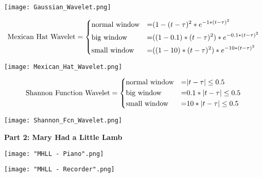\documentclass{cup-pan}
\begin{document}
\begin{center}
\texttt{[image: Gaussian\_Wavelet.png]}
\end{center}

\vskip 1.0in

$$\text{Mexican Hat Wavelet}=\begin{equation}
\left\{
  \begin{aligned}
    &\text{normal window} &= \space &(1-(t - \tau)^{2}* e^{-1*(t-\tau)^{2}} \\
    &\text{big window} &= \space &((1-0.1)*(t - \tau)^{2})* e^{-0.1*(t-\tau)^{2}} \\
    &\text{small window}  &= \space &((1-10)*(t - \tau)^{2})* e^{-10*(t-\tau)^{2}} \\
  \end{aligned}
  \right.
\end{equation}
$$

\begin{center}
\texttt{[image: Mexican\_Hat\_Wavelet.png]}
\end{center}

\vskip 1.0in

$$\text{Shannon Function Wavelet}=\begin{equation}
\left\{
  \begin{aligned}
    &\text{normal window} &=  \space &|t-\tau| \leq 0.5 \\
    &\text{big window} &= \space &0.1*|t-\tau| \leq 0.5 \\
    &\text{small window}  &= \space &10*|t-\tau| \leq 0.5 \\
  \end{aligned}
  \right.
\end{equation}
$$

\begin{center}
\texttt{[image: Shannon\_Fcn\_Wavelet.png]}
\end{center}

\textbf{Part 2: Mary Had a Little Lamb}

\begin{center}
\texttt{[image: "MHLL - Piano".png]}
\end{center}

\begin{center}
\texttt{[image: "MHLL - Recorder".png]}
\end{center}
\end{document}
